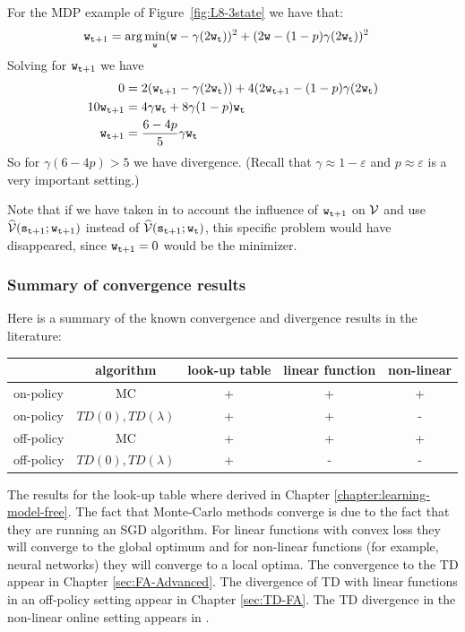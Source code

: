 For the MDP example of Figure~\ref{fig:L8-3state} we have that:
\begin{align*}
 {\tt w}_{{\tt t}+1} &= \arg\min_{\tt w} ({\tt w}-\gamma(2{\tt w}_{\tt t}))^2+(2{\tt w}-(1-p)\gamma(2{\tt w}_{\tt t}))^2
\end{align*}
Solving for ${\tt w}_{{\tt t}+1}$ we have
\begin{align*}
0&=  2({\tt w}_{{\tt t}+1}-\gamma(2{\tt w}_{\tt t}))+4(2{\tt w}_{{\tt t}+1}-(1-p)\gamma(2{\tt w}_{\tt t})\\
  10 {\tt w}_{{\tt t}+1}&=4\gamma {\tt w}_{\tt t} + 8\gamma(1-p){\tt w}_{\tt t}\\
  {\tt w}_{{\tt t}+1}&=\frac{6-4p}{5}\gamma {\tt w}_{\tt t}
\end{align*}
So for $\gamma(6-4p)>5$ we have divergence. (Recall that
$\gamma\approx 1-\varepsilon$ and $p\approx \varepsilon$ is a very
important setting.)

Note that if we have taken in to account the influence of
${\tt w}_{{\tt t}+1}$ on $\mathcal{V}$ and use
$\widehat{\mathcal{V}}({\tt s}_{{\tt t}+1};{\tt w}_{{\tt t}+1})$ instead of
$\widehat{\mathcal{V}}({\tt s}_{{\tt t}+1};{\tt w}_{\tt t})$, this specific
problem would have disappeared, since ${\tt w}_{{\tt t}+1}=0$ would
be the minimizer.

\subsubsection{Summary of convergence results} Here is a summary of the known convergence and divergence results in
the literature:
\begin{center}
  \begin{tabular}{ | l | c | c|c|c| }
    \hline
    & algorithm & look-up table&linear function&non-linear\\ \hline
    on-policy & MC & + & + & + \\ \hline
    on-policy & $TD(0),TD(\lambda)$ & + & + & -\\ \hline
    off-policy & MC & + & + & + \\ \hline
    off-policy & $TD(0),TD(\lambda)$ & + & - & -\\ \hline
  \end{tabular}
\end{center}

The results for the look-up table where derived in Chapter
\ref{chapter:learning-model-free}.
%
The fact that Monte-Carlo methods converge is due to the fact that
they are running an SGD algorithm. For linear functions with convex
loss they will converge to the global optimum and for non-linear
functions (for example, neural networks) they will converge to a
local optima. The convergence to the TD appear in Chapter
\ref{sec:FA-Advanced}. The divergence of TD with linear functions in
an off-policy setting appear in Chapter \ref{sec:TD-FA}. The TD
divergence in the non-linear online setting appears in
\cite{TsitsiklisVR97}.
